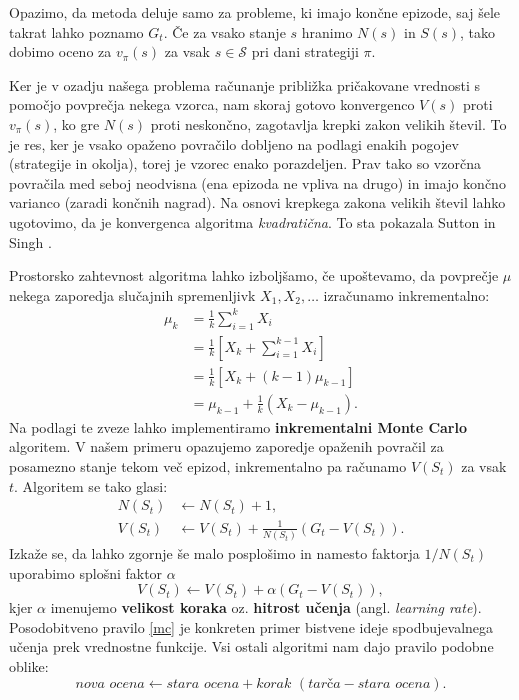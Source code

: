 \documentclass[12pt,a4paper]{amsart}
\theoremstyle{definition} %
\theoremstyle{plain} %
\begin{document}
Opazimo, da metoda deluje samo za probleme, ki imajo končne epizode, saj šele takrat lahko poznamo $G_t$. 
Če za vsako stanje $s$ hranimo $N(s)$ in $S(s)$, tako dobimo oceno za $v_\pi(s)$ za vsak $s \in 
\mathcal{S}$ pri dani strategiji $\pi$.

Ker je v ozadju našega problema računanje približka pričakovane vrednosti s pomočjo povprečja nekega 
vzorca, nam skoraj gotovo konvergenco $V(s)$ proti $v_\pi(s)$, ko gre $N(s)$ proti neskončno,
zagotavlja krepki zakon velikih števil. To je res, ker je vsako opaženo povračilo dobljeno na podlagi 
enakih pogojev (strategije in okolja), torej je vzorec enako porazdeljen. Prav tako so vzorčna povračila 
med seboj neodvisna (ena epizoda ne vpliva na drugo) in imajo končno varianco (zaradi končnih nagrad). 
Na osnovi krepkega zakona velikih števil lahko ugotovimo, da je konvergenca algoritma \textit{kvadratična}. 
To sta pokazala Sutton in Singh \cite{MCdokaz}.

Prostorsko zahtevnost algoritma lahko izboljšamo, če upoštevamo, da povprečje $\mu$ nekega zaporedja 
slučajnih spremenljivk $X_1, X_2, \dots$ izračunamo inkrementalno:
\begin{align*}
    \mu_k &= \frac{1}{k} \sum_{i = 1}^k X_i \\
        &= \frac{1}{k} \left[X_k + \sum_{i = 1}^{k-1} X_i \right] \\
        &= \frac{1}{k} \left[X_k + (k-1) \mu_{k-1} \right] \\
        &= \mu_{k-1} + \frac{1}{k} \left(X_k - \mu_{k-1} \right).
\end{align*}
Na podlagi te zveze lahko implementiramo \textbf{inkrementalni Monte Carlo} algoritem. V našem primeru
opazujemo zaporedje opaženih povračil za posamezno stanje tekom več epizod, inkrementalno pa računamo 
$V(S_t)$ za vsak $t$. Algoritem se tako glasi:
\begin{align*}
    N(S_t) &\leftarrow N(S_t) + 1, \\
    V(S_t) &\leftarrow V(S_t) + \frac{1}{N(S_t)} (G_t - V(S_t)).
\end{align*}
Izkaže se, da lahko zgornje še malo posplošimo in namesto faktorja $1/N(S_t)$ uporabimo splošni 
faktor $\alpha$
\begin{equation}\label{mc}
    V(S_t) \leftarrow V(S_t) + \alpha (G_t - V(S_t)),
\end{equation}
kjer $\alpha$ imenujemo \textbf{velikost koraka} oz. \textbf{hitrost učenja} (angl. 
\textit{learning rate}). Posodobitveno pravilo \eqref{mc} je konkreten primer bistvene ideje 
spodbujevalnega učenja prek vrednostne funkcije. Vsi ostali algoritmi nam dajo pravilo podobne 
oblike: 
\begin{equation}\label{osnova}
    \textit{nova ocena} \leftarrow \textit{stara ocena} + \textit{korak } 
    (\textit{tarča} - \textit{stara ocena}).
\end{equation}
\end{document}
